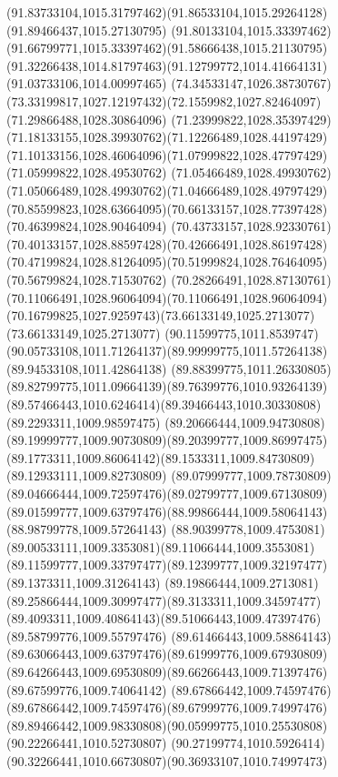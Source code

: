 {{	\curveto(91.83733104,1015.31797462)(91.86533104,1015.29264128)(91.89466437,1015.27130795)
	\curveto(91.80133104,1015.33397462)(91.66799771,1015.33397462)(91.58666438,1015.21130795)
	\curveto(91.32266438,1014.81797463)(91.12799772,1014.41664131)(91.03733106,1014.00997465)
	\lineto(74.34533147,1026.38730767)
	\curveto(73.33199817,1027.12197432)(72.1559982,1027.82464097)(71.29866488,1028.30864096)
	\curveto(71.23999822,1028.35397429)(71.18133155,1028.39930762)(71.12266489,1028.44197429)
	\curveto(71.10133156,1028.46064096)(71.07999822,1028.47797429)(71.05999822,1028.49530762)
	\curveto(71.05466489,1028.49930762)(71.05066489,1028.49930762)(71.04666489,1028.49797429)
	\curveto(70.85599823,1028.63664095)(70.66133157,1028.77397428)(70.46399824,1028.90464094)
	\curveto(70.43733157,1028.92330761)(70.40133157,1028.88597428)(70.42666491,1028.86197428)
	\curveto(70.47199824,1028.81264095)(70.51999824,1028.76464095)(70.56799824,1028.71530762)
	\curveto(70.28266491,1028.87130761)(70.11066491,1028.96064094)(70.11066491,1028.96064094)
	\curveto(70.16799825,1027.9259743)(73.66133149,1025.2713077)(73.66133149,1025.2713077)
	\lineto(90.11599775,1011.8539747)
	\curveto(90.05733108,1011.71264137)(89.99999775,1011.57264138)(89.94533108,1011.42864138)
	\curveto(89.88399775,1011.26330805)(89.82799775,1011.09664139)(89.76399776,1010.93264139)
	\curveto(89.57466443,1010.6246414)(89.39466443,1010.30330808)(89.2293311,1009.98597475)
	\curveto(89.20666444,1009.94730808)(89.19999777,1009.90730809)(89.20399777,1009.86997475)
	\curveto(89.1773311,1009.86064142)(89.1533311,1009.84730809)(89.12933111,1009.82730809)
	\curveto(89.07999777,1009.78730809)(89.04666444,1009.72597476)(89.02799777,1009.67130809)
	\curveto(89.01599777,1009.63797476)(88.99866444,1009.58064143)(88.98799778,1009.57264143)
	\curveto(88.90399778,1009.4753081)(89.00533111,1009.3353081)(89.11066444,1009.3553081)
	\curveto(89.11599777,1009.33797477)(89.12399777,1009.32197477)(89.1373311,1009.31264143)
	\curveto(89.19866444,1009.2713081)(89.25866444,1009.30997477)(89.3133311,1009.34597477)
	\curveto(89.4093311,1009.40864143)(89.51066443,1009.47397476)(89.58799776,1009.55797476)
	\curveto(89.61466443,1009.58864143)(89.63066443,1009.63797476)(89.61999776,1009.67930809)
	\curveto(89.64266443,1009.69530809)(89.66266443,1009.71397476)(89.67599776,1009.74064142)
	\curveto(89.67866442,1009.74597476)(89.67866442,1009.74597476)(89.67999776,1009.74997476)
	\curveto(89.89466442,1009.98330808)(90.05999775,1010.25530808)(90.22266441,1010.52730807)
	\curveto(90.27199774,1010.5926414)(90.32266441,1010.66730807)(90.36933107,1010.74997473)
}}
